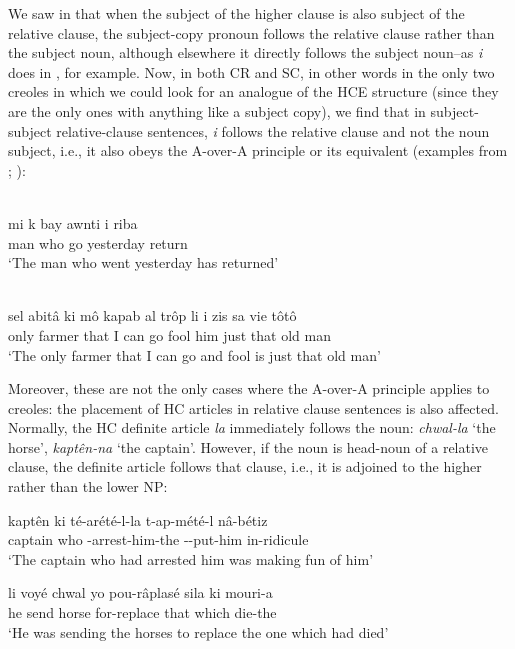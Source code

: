 We saw in  that when the subject of the higher clause is also subject of the relative clause, the subject-copy pronoun follows the relative clause rather than the subject noun, although elsewhere it directly follows the subject noun--as \textit{i} does in , for example. Now, in both CR and SC, in other words in the only two creoles in which we could look for an analogue of the HCE structure (since they are the only ones with anything like a subject copy), we find that in subject-subject relative-clause sentences, \textit{i} follows the relative clause and not the noun subject, i.e., it also obeys the A-over-A principle or its equivalent (examples from \citealt[30]{Wilson1962}; \citealt[53]{Corne1977}):

\ea\label{ex:2:48}
\\
 \gll mi k bay awnti i riba\\
man who go yesterday {\PM} return\\
\glt `The man who went yesterday has returned'
\z
{}

\ea\label{ex:2:49}
\\
 \gll sel abit{\^a} ki m{\^o} kapab al tr{\^o}p li i zis sa vie t{\^o}t{\^o}\\
 only farmer that I can go fool him {\PM} just that old man  \\
\glt `The only farmer that I can go and fool is just that old man'
\z

Moreover, these are not the only cases where the A-over-A principle applies to creoles: the placement of HC articles in relative\-
clause sentences is also affected. Normally, the HC definite article \textit{la} immediately follows the noun: \textit{chwal-la} `the horse', \textit{kapt{\^e}n-na} `the captain'. However, if the noun is head-noun of a relative clause, the definite article follows that clause, i.e., it is adjoined to the higher rather than the lower NP:

\ea\label{ex:2:50}
\gll kapt{\^e}n ki té-arété-l-la t-ap-mété-l n{\^a}-bétiz\\
captain who \TNS-arrest-him-the \TNS-\ASP-put-him in-ridicule\\
\glt  `The captain who had arrested him was making fun of him'
\z

\ea\label{ex:2:51}
 \gll li voyé chwal yo pou-r{\^a}plasé sila ki mouri-a\\
he send horse {\PL} for-replace that which die-the\\
\glt `He was sending the horses to replace the one which had died'
\z

